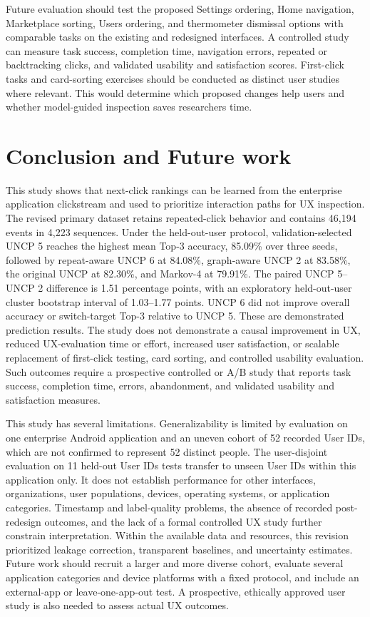 \documentclass[sn-mathphys-num, Numbered]{sn-jnl}%
\theoremstyle{thmstyleone}%
\theoremstyle{thmstyletwo}%
\theoremstyle{thmstylethree}%
\begin{document}
Future evaluation should test the proposed Settings ordering, Home navigation, Marketplace sorting, Users ordering, and thermometer dismissal options with comparable tasks on the existing and redesigned interfaces. A controlled study can measure task success, completion time, navigation errors, repeated or backtracking clicks, and validated usability and satisfaction scores. First-click tasks and card-sorting exercises should be conducted as distinct user studies where relevant. This would determine which proposed changes help users and whether model-guided inspection saves researchers time.

\section{Conclusion and Future work}
This study shows that next-click rankings can be learned from the enterprise application clickstream and used to prioritize interaction paths for UX inspection. The revised primary dataset retains repeated-click behavior and contains 46,194 events in 4,223 sequences. Under the held-out-user protocol, validation-selected UNCP 5 reaches the highest mean Top-3 accuracy, 85.09\% over three seeds, followed by repeat-aware UNCP 6 at 84.08\%, graph-aware UNCP 2 at 83.58\%, the original UNCP at 82.30\%, and Markov-4 at 79.91\%. The paired UNCP 5--UNCP 2 difference is 1.51 percentage points, with an exploratory held-out-user cluster bootstrap interval of 1.03--1.77 points. UNCP 6 did not improve overall accuracy or switch-target Top-3 relative to UNCP 5. These are demonstrated prediction results. The study does not demonstrate a causal improvement in UX, reduced UX-evaluation time or effort, increased user satisfaction, or scalable replacement of first-click testing, card sorting, and controlled usability evaluation. Such outcomes require a prospective controlled or A/B study that reports task success, completion time, errors, abandonment, and validated usability and satisfaction measures.

This study has several limitations. Generalizability is limited by evaluation on one enterprise Android application and an uneven cohort of 52 recorded User IDs, which are not confirmed to represent 52 distinct people. The user-disjoint evaluation on 11 held-out User IDs tests transfer to unseen User IDs within this application only. It does not establish performance for other interfaces, organizations, user populations, devices, operating systems, or application categories. Timestamp and label-quality problems, the absence of recorded post-redesign outcomes, and the lack of a formal controlled UX study further constrain interpretation. Within the available data and resources, this revision prioritized leakage correction, transparent baselines, and uncertainty estimates. Future work should recruit a larger and more diverse cohort, evaluate several application categories and device platforms with a fixed protocol, and include an external-app or leave-one-app-out test. A prospective, ethically approved user study is also needed to assess actual UX outcomes.
\end{document}
